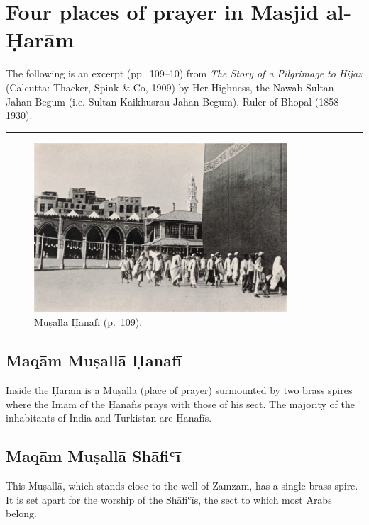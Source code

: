 \hypertarget{four-places-of-prayer-haram}{%
  \chapter{Four places of prayer in Masjid al-Ḥarām}\label{four-places-of-prayer-haram}}


The following is an excerpt (pp.\ 109–10) from \textit{The Story of a Pilgrimage to Hijaz} (Calcutta: Thacker, Spink \& Co, 1909) by Her Highness, the Nawab Sultan Jahan Begum (i.e. Sultan Kaikhusrau Jahan Begum), Ruler of Bhopal (1858--1930).\\
\hrule

\begin{figure}
  \begin{center}
    \includegraphics[width=0.84\textwidth]{images/haram2}
  \end{center}
  \caption*{Muṣallā Ḥanafī (p.\ 109).}
\end{figure}

\section*{Maqām Muṣallā Ḥanafī}

Inside the Ḥarām is a Muṣallā (place of prayer) surmounted by two brass spires where the Imam of the Ḥanafīs prays with those of his sect. The majority of the inhabitants of India and Turkistan are Ḥanafīs.

\section*{Maqām Muṣallā Shāfiʿī}

This Muṣallā, which stands close to the well of Zamzam, has a single brass spire. It is set apart for the worship of the Shāfiʿīs, the sect to which most Arabs belong.


